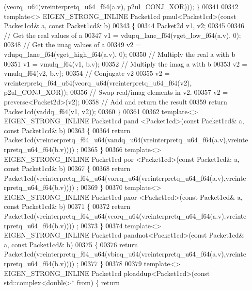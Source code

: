 \begin{DoxyCode}
      (veorq\_u64(vreinterpretq\_u64\_f64(a.v), p2ul\_CONJ\_XOR))); \}
00341 
00342 \textcolor{keyword}{template}<> EIGEN\_STRONG\_INLINE Packet1cd pmul<Packet1cd>(\textcolor{keyword}{const} Packet1cd& a, \textcolor{keyword}{const} Packet1cd& b)
00343 \{
00344   Packet2d v1, v2;
00345 
00346   \textcolor{comment}{// Get the real values of a }
00347   v1 = vdupq\_lane\_f64(vget\_low\_f64(a.v), 0);
00348   \textcolor{comment}{// Get the imag values of a}
00349   v2 = vdupq\_lane\_f64(vget\_high\_f64(a.v), 0);
00350   \textcolor{comment}{// Multiply the real a with b}
00351   v1 = vmulq\_f64(v1, b.v);
00352   \textcolor{comment}{// Multiply the imag a with b}
00353   v2 = vmulq\_f64(v2, b.v);
00354   \textcolor{comment}{// Conjugate v2 }
00355   v2 = vreinterpretq\_f64\_u64(veorq\_u64(vreinterpretq\_u64\_f64(v2), p2ul\_CONJ\_XOR));
00356   \textcolor{comment}{// Swap real/imag elements in v2.}
00357   v2 = preverse<Packet2d>(v2);
00358   \textcolor{comment}{// Add and return the result}
00359   \textcolor{keywordflow}{return} Packet1cd(vaddq\_f64(v1, v2));
00360 \}
00361 
00362 \textcolor{keyword}{template}<> EIGEN\_STRONG\_INLINE Packet1cd pand   <Packet1cd>(\textcolor{keyword}{const} Packet1cd& a, \textcolor{keyword}{const} Packet1cd& b)
00363 \{
00364   \textcolor{keywordflow}{return} Packet1cd(vreinterpretq\_f64\_u64(vandq\_u64(vreinterpretq\_u64\_f64(a.v),vreinterpretq\_u64\_f64(b.v))))
      ;
00365 \}
00366 \textcolor{keyword}{template}<> EIGEN\_STRONG\_INLINE Packet1cd por    <Packet1cd>(\textcolor{keyword}{const} Packet1cd& a, \textcolor{keyword}{const} Packet1cd& b)
00367 \{
00368   \textcolor{keywordflow}{return} Packet1cd(vreinterpretq\_f64\_u64(vorrq\_u64(vreinterpretq\_u64\_f64(a.v),vreinterpretq\_u64\_f64(b.v))))
      ;
00369 \}
00370 \textcolor{keyword}{template}<> EIGEN\_STRONG\_INLINE Packet1cd pxor   <Packet1cd>(\textcolor{keyword}{const} Packet1cd& a, \textcolor{keyword}{const} Packet1cd& b)
00371 \{
00372   \textcolor{keywordflow}{return} Packet1cd(vreinterpretq\_f64\_u64(veorq\_u64(vreinterpretq\_u64\_f64(a.v),vreinterpretq\_u64\_f64(b.v))))
      ;
00373 \}
00374 \textcolor{keyword}{template}<> EIGEN\_STRONG\_INLINE Packet1cd pandnot<Packet1cd>(\textcolor{keyword}{const} Packet1cd& a, \textcolor{keyword}{const} Packet1cd& b)
00375 \{
00376   \textcolor{keywordflow}{return} Packet1cd(vreinterpretq\_f64\_u64(vbicq\_u64(vreinterpretq\_u64\_f64(a.v),vreinterpretq\_u64\_f64(b.v))))
      ;
00377 \}
00378 
00379 \textcolor{keyword}{template}<> EIGEN\_STRONG\_INLINE Packet1cd ploaddup<Packet1cd>(\textcolor{keyword}{const} std::complex<double>* from) \{ \textcolor{keywordflow}{return} 

\end{DoxyCode}
